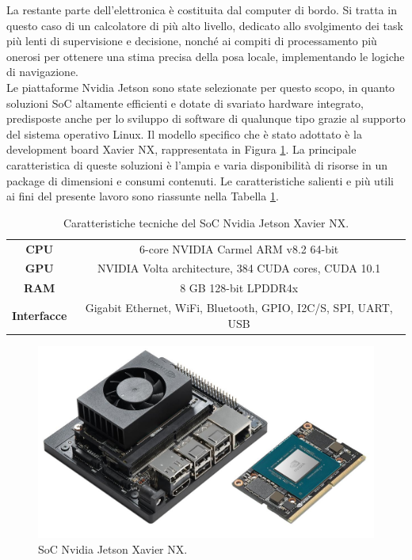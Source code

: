 \indent La restante parte dell'elettronica è costituita dal computer di bordo. Si tratta in questo caso di un calcolatore di più alto livello, dedicato allo svolgimento dei task più lenti di supervisione e decisione, nonché ai compiti di processamento più onerosi per ottenere una stima precisa della posa locale, implementando le logiche di navigazione.\\
Le piattaforme Nvidia Jetson sono state selezionate per questo scopo, in quanto soluzioni SoC altamente efficienti e dotate di svariato hardware integrato, predisposte anche per lo sviluppo di software di qualunque tipo grazie al supporto del sistema operativo Linux. Il modello specifico che è stato adottato è la development board Xavier NX, rappresentata in Figura \ref{fig:nx}. La principale caratteristica di queste soluzioni è l'ampia e varia disponibilità di risorse in un package di dimensioni e consumi contenuti. Le caratteristiche salienti e più utili ai fini del presente lavoro sono riassunte nella Tabella \ref{tab:nx}.
\vspace{0.5cm}
\begin{table}[h]
    \centering
    \begin{tabular}{c|c}
        \textbf{CPU} & 6-core NVIDIA Carmel ARM v8.2 64-bit\\
        \textbf{GPU} & NVIDIA Volta architecture, 384 CUDA cores, CUDA 10.1\\
        \textbf{RAM} & 8 GB 128-bit LPDDR4x\\
        \textbf{Interfacce} & Gigabit Ethernet, WiFi, Bluetooth, GPIO, I2C/S, SPI, UART, USB
    \end{tabular}
    \caption{Caratteristiche tecniche del SoC Nvidia Jetson Xavier NX.}
    \label{tab:nx}
\end{table}

\begin{figure}
    \centering
    \includegraphics[scale=0.35]{figs/chapter3/nx.jpg}
    \caption{SoC Nvidia Jetson Xavier NX.}
    \label{fig:nx}
\end{figure}

